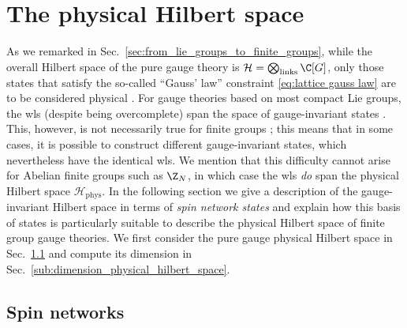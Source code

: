 \section{The physical Hilbert space}\label{sec:physical Hilbert space}

As we remarked in Sec.~\ref{sec:from_lie_groups_to_finite_groups}, while the overall Hilbert space of the pure gauge theory is $\mathcal{H} = \bigotimes_{\mathrm{links}} \C[G]$, only those states that satisfy the so-called ``Gauss' law'' constraint \eqref{eq:lattice gauss law} are to be considered physical \cite{kogut1975hamiltonian, milstead2018qyangmills, tong2018gauge}.
For gauge theories based on most compact Lie groups, the \ac{wl}s (despite being overcomplete) span the space of gauge-invariant states \cite{sengupta1994gaugeinvariant, durhuus1980gaugeinvariant}.
This, however, is not necessarily true for finite groups \cite{sengupta1994gaugeinvariant, cui2020kitaev}; this means that in some cases, it is possible to construct different gauge-invariant states, which nevertheless have the identical \ac{wl}s.
We mention that this difficulty cannot arise for Abelian finite groups such as $\Z_N$, in which case the \ac{wl}s \textit{do} span the physical Hilbert space $\mathcal{H}_{\mathrm{phys}}$.
In the following section we give a description of the gauge-invariant Hilbert space in terms of \textit{spin network states} and explain how this basis of states is particularly suitable to describe the physical Hilbert space of finite group gauge theories.
We first consider the pure gauge physical Hilbert space in Sec.~\ref{sec:spin networks pure gauge} and compute its dimension in Sec.~\ref{sub:dimension_physical_hilbert_space}.

\subsection{Spin networks}\label{sec:spin networks pure gauge}

